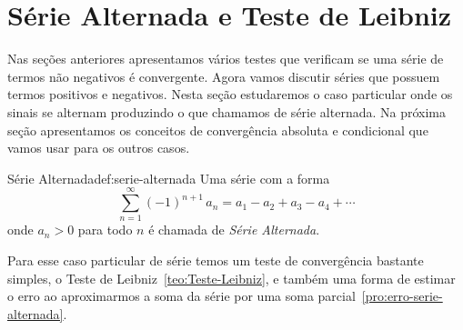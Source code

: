 \section{Série Alternada e Teste de Leibniz}

Nas seções anteriores apresentamos vários testes que verificam se uma
série de termos não negativos é convergente. Agora vamos discutir
séries que possuem termos positivos e negativos. Nesta seção
estudaremos o caso particular onde os sinais se alternam produzindo o que
chamamos de série alternada. Na próxima seção apresentamos os conceitos de
convergência absoluta e condicional que vamos usar para os outros casos.

\begin{definicao}{Série Alternada}{def:serie-alternada}
  Uma série com a forma
  \[
    \sum_{n=1}^\infty (-1)^{n+1}\,a_n
    = a_1 - a_2 + a_3 - a_4 + \cdots
  \]
  onde $a_n>0$ para todo $n$ é chamada de
\emph{Série Alternada}.
\end{definicao}

Para esse caso particular de série temos um teste de convergência bastante
simples, o Teste de Leibniz~\ref{teo:Teste-Leibniz}, e também uma forma de
estimar o erro ao aproximarmos a soma da série
por uma soma parcial~\ref{pro:erro-serie-alternada}.

